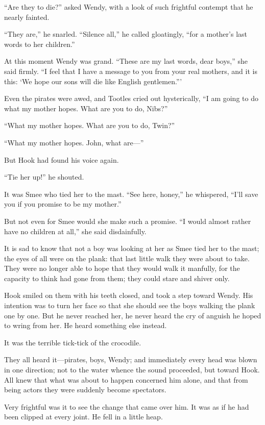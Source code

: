 ``Are they to die?'' asked Wendy, with a look of such frightful contempt
that he nearly fainted.

``They are,'' he snarled. ``Silence all,'' he called gloatingly, ``for a
mother's last words to her children.''

At this moment Wendy was grand. ``These are my last words, dear boys,''
she said firmly. ``I feel that I have a message to you from your real
mothers, and it is this: ‘We hope our sons will die like English
gentlemen.'''

Even the pirates were awed, and Tootles cried out hysterically, ``I am
going to do what my mother hopes. What are you to do, Nibs?''

``What my mother hopes. What are you to do, Twin?''

``What my mother hopes. John, what are—''

But Hook had found his voice again.

``Tie her up!'' he shouted.

It was Smee who tied her to the mast. ``See here, honey,'' he whispered,
``I'll save you if you promise to be my mother.''

But not even for Smee would she make such a promise. ``I would almost
rather have no children at all,'' she said disdainfully.

It is sad to know that not a boy was looking at her as Smee tied her to
the mast; the eyes of all were on the plank: that last little walk they
were about to take. They were no longer able to hope that they would
walk it manfully, for the capacity to think had gone from them; they
could stare and shiver only.

Hook smiled on them with his teeth closed, and took a step toward
Wendy. His intention was to turn her face so that she should see the
boys walking the plank one by one. But he never reached her, he never
heard the cry of anguish he hoped to wring from her. He heard something
else instead.

It was the terrible tick-tick of the crocodile.

They all heard it—pirates, boys, Wendy; and immediately every head was
blown in one direction; not to the water whence the sound proceeded,
but toward Hook. All knew that what was about to happen concerned him
alone, and that from being actors they were suddenly become spectators.

Very frightful was it to see the change that came over him. It was as
if he had been clipped at every joint. He fell in a little heap.

